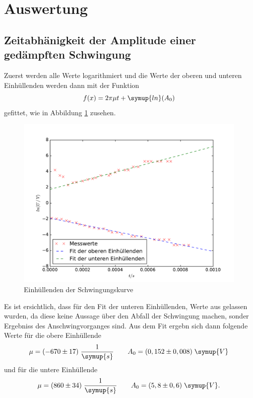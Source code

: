 \section{Auswertung}
\label{sec:Auswertung}
\subsection{Zeitabhänigkeit der Amplitude einer gedämpften Schwingung}
  Zuerst werden alle Werte logarithmiert und die Werte der
  oberen und unteren Einhüllenden werden dann mit der Funktion
  \begin{equation*}
    f(x)= 2\pi\mu t + \symup{ln} (A_0)
  \end{equation*}
  gefittet, wie in Abbildung \ref{fig:5aplot} zusehen.
    \begin{figure}
      \centering
      \includegraphics[width=\textwidth]{./plots/5aplotreload.pdf}
        \caption{Einhüllenden der Schwingungskurve}
        \label{fig:5aplot}
      \end{figure}
\FloatBarrier
Es ist ersichtlich, dass für den Fit der unteren Einhüllenden,
Werte aus gelassen wurden, da
diese keine Aussage über den Abfall der Schwingung machen,
 sonder Ergebniss des Anschwingvorganges sind.
  Aus dem Fit ergebn sich dann folgende Werte für die obere Einhüllende
  \begin{equation*}
    \mu = (-670 \pm 17)\; \frac{1}{\symup{s}}
    \qquad A_0  = (0,152 \pm 0,008) \;\symup{V}
  \end{equation*}
  und für die untere Einhüllende
  \begin{equation*}
    \mu = (860 \pm 34) \; \frac{1}{\symup{s}}
     \qquad A_0 = (5,8 \pm 0,6)\;\symup{V}.
  \end{equation*}
